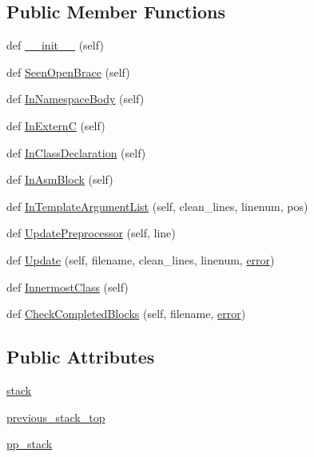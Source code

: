 \subsection*{Public Member Functions}
\begin{DoxyCompactItemize}
\item 
def \hyperlink{classcpplint_1_1_nesting_state_a47e1ad559b9c7304f53d19ef6ebedab4}{\+\_\+\+\_\+init\+\_\+\+\_\+} (self)
\item 
def \hyperlink{classcpplint_1_1_nesting_state_a15abc0719a22ca8fbb7a8235f0e22b3e}{Seen\+Open\+Brace} (self)
\item 
def \hyperlink{classcpplint_1_1_nesting_state_a1a06f50d53cfe11b1f78d45b531e0c32}{In\+Namespace\+Body} (self)
\item 
def \hyperlink{classcpplint_1_1_nesting_state_a67aa1907d42b8408c227ff18537071c7}{In\+ExternC} (self)
\item 
def \hyperlink{classcpplint_1_1_nesting_state_a8e111c25149c41bd8927606244965b3c}{In\+Class\+Declaration} (self)
\item 
def \hyperlink{classcpplint_1_1_nesting_state_aa35a529052e4863a477eae649ce778d2}{In\+Asm\+Block} (self)
\item 
def \hyperlink{classcpplint_1_1_nesting_state_a8f4e9ba1aaa0459de2bedd966e7a2b54}{In\+Template\+Argument\+List} (self, clean\+\_\+lines, linenum, pos)
\item 
def \hyperlink{classcpplint_1_1_nesting_state_ac3d509c536af445e8ab6b17b067b53f1}{Update\+Preprocessor} (self, line)
\item 
def \hyperlink{classcpplint_1_1_nesting_state_a3adead8c1575b98ace5c5230f3772c1e}{Update} (self, filename, clean\+\_\+lines, linenum, \hyperlink{_07copy_08_2_read_camera_model_8m_ac546fdc9911f4a876dbfaffbc7426f8b}{error})
\item 
def \hyperlink{classcpplint_1_1_nesting_state_a4141768e75b16698463670caaa587120}{Innermost\+Class} (self)
\item 
def \hyperlink{classcpplint_1_1_nesting_state_a7bde5ab65152b4073763b1bd17cba567}{Check\+Completed\+Blocks} (self, filename, \hyperlink{_07copy_08_2_read_camera_model_8m_ac546fdc9911f4a876dbfaffbc7426f8b}{error})
\end{DoxyCompactItemize}
\subsection*{Public Attributes}
\begin{DoxyCompactItemize}
\item 
\hyperlink{classcpplint_1_1_nesting_state_a6ae9bea040f988d152922788d0d73a15}{stack}
\item 
\hyperlink{classcpplint_1_1_nesting_state_a7aa34c8fb8df73d76f702c7012c46911}{previous\+\_\+stack\+\_\+top}
\item 
\hyperlink{classcpplint_1_1_nesting_state_a3a5ca37e3066d91830ea1faa8feae4e5}{pp\+\_\+stack}
\end{DoxyCompactItemize}



